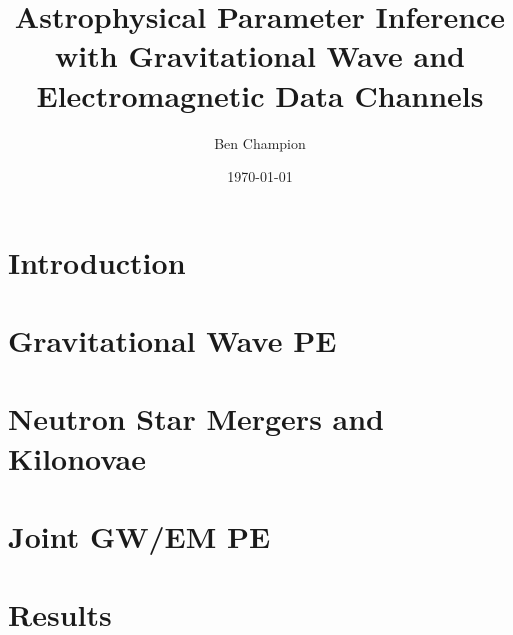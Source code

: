 \documentclass{beamer}
\begin{document}
\title{Astrophysical Parameter Inference with Gravitational Wave and Electromagnetic Data Channels}
\author{Ben Champion}


\date{
  \today
}

\frame{
  \titlepage
}



\section{Introduction}


\section{Gravitational Wave PE}

\frame{
}

\section{Neutron Star Mergers and Kilonovae}

\frame{
}

\section{Joint GW/EM PE}

\frame{
}

\section{Results}

\frame{
}
\end{document}
